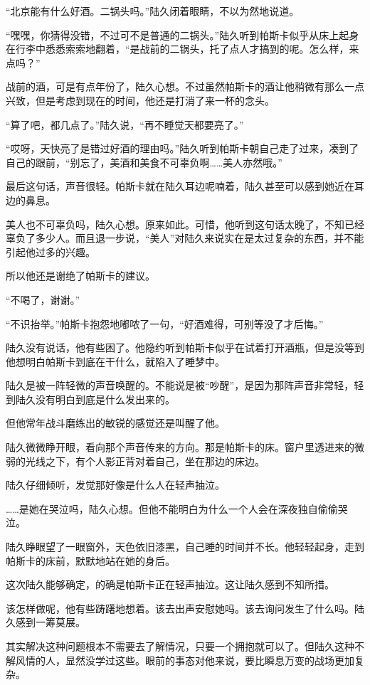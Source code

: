 “北京能有什么好酒。二锅头吗。”陆久闭着眼睛，不以为然地说道。

“嘿嘿，你猜得没错，不过可不是普通的二锅头。”陆久听到帕斯卡似乎从床上起身在行李中悉悉索索地翻着，“是战前的二锅头，托了点人才搞到的呢。怎么样，来点吗？”

战前的酒，可是有点年份了，陆久心想。不过虽然帕斯卡的酒让他稍微有那么一点兴致，但是考虑到现在的时间，他还是打消了来一杯的念头。

“算了吧，都几点了。”陆久说，“再不睡觉天都要亮了。”

“哎呀，天快亮了是错过好酒的理由吗。”陆久听到帕斯卡朝自己走了过来，凑到了自己的跟前，“别忘了，美酒和美食不可辜负啊……美人亦然哦。”

最后这句话，声音很轻。帕斯卡就在陆久耳边呢喃着，陆久甚至可以感到她近在耳边的鼻息。

美人也不可辜负吗，陆久心想。原来如此。可惜，他听到这句话太晚了，不知已经辜负了多少人。而且退一步说，“美人”对陆久来说实在是太过复杂的东西，并不能引起他过多的兴趣。

所以他还是谢绝了帕斯卡的建议。

“不喝了，谢谢。”

“不识抬举。”帕斯卡抱怨地嘟哝了一句，“好酒难得，可别等没了才后悔。”

陆久没有说话，他有些困了。他隐约听到帕斯卡似乎在试着打开酒瓶，但是没等到他想明白帕斯卡到底在干什么，就陷入了睡梦中。

陆久是被一阵轻微的声音唤醒的。不能说是被“吵醒”，是因为那阵声音非常轻，轻到陆久没有明白到底是什么发出来的。

但他常年战斗磨练出的敏锐的感觉还是叫醒了他。

陆久微微睁开眼，看向那个声音传来的方向。那是帕斯卡的床。窗户里透进来的微弱的光线之下，有个人影正背对着自己，坐在那边的床边。

陆久仔细倾听，发觉那好像是什么人在轻声抽泣。

……是她在哭泣吗，陆久心想。但他不能明白为什么一个人会在深夜独自偷偷哭泣。

陆久睁眼望了一眼窗外，天色依旧漆黑，自己睡的时间并不长。他轻轻起身，走到帕斯卡的床前，默默地站在她的身后。

这次陆久能够确定，的确是帕斯卡正在轻声抽泣。这让陆久感到不知所措。

该怎样做呢，他有些踌躇地想着。该去出声安慰她吗。该去询问发生了什么吗。陆久感到一筹莫展。

其实解决这种问题根本不需要去了解情况，只要一个拥抱就可以了。但陆久这种不解风情的人，显然没学过这些。眼前的事态对他来说，要比瞬息万变的战场更加复杂。

